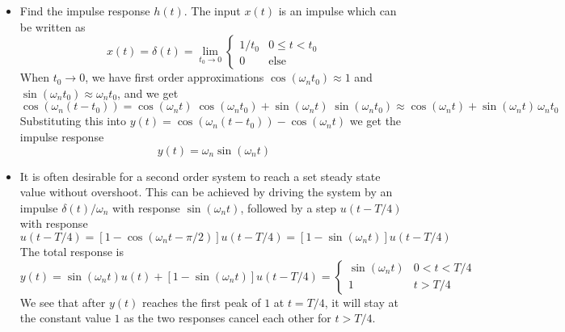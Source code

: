 \documentclass{article}
\begin{document}
\begin{itemize}
\item Find the impulse response $h(t)$. The input $x(t)$ is an impulse which
  can be written as
  \begin{equation}
    x(t)=\delta(t)=\lim_{t_0\rightarrow 0}\left\{ \begin{array}{cl}
      1/t_0 & 0\le t< t_0 \\0 & \mbox{else} \end{array}\right. 
  \end{equation}
  When $t_0\rightarrow 0$, we have first order approximations 
  $\cos(\omega_nt_0)\approx 1$ and $\sin(\omega_nt_0)\approx \omega_nt_0$, 
  and we get
  \begin{equation} 
    \cos(\omega_n(t-t_0))=\cos(\omega_nt)\;\cos(\omega_nt_0)+\sin(\omega_nt)\;
    \sin(\omega_nt_0)  \approx\cos(\omega_nt)+\sin(\omega_nt)\,\omega_nt_0
  \end{equation}
  Substituting this into $y(t)=\cos(\omega_n(t-t_0))-\cos(\omega_nt)$
  we get the impulse response 
  \begin{equation}
    y(t)=\omega_n\sin(\omega_nt) 
  \end{equation}
  
\item It is often desirable for a second order system to reach a set steady 
  state value without overshoot. This can be achieved by driving the system 
  by an impulse $\delta(t)/\omega_n$ with response $\sin(\omega_nt)$, followed 
  by a step $u(t-T/4)$ with response 
  \begin{equation}
    [1-\cos(\omega_n(t-T/4))]u(t-T/4)=[1-\cos(\omega_nt-\pi/2)]u(t-T/4)
    =[1-\sin(\omega_nt)]u(t-T/4) 
  \end{equation}
  The total response is
  \begin{equation}
    y(t)=\sin(\omega_nt)u(t)+[1-\sin(\omega_nt)]u(t-T/4)
    =\left\{\begin{array}{cl} \sin(\omega_nt) & 0<t<T/4 \\
    1 & t>T/4\end{array} \right. 
  \end{equation}
  We see that after $y(t)$ reaches the first peak of $1$ at $t=T/4$, it will
  stay at the constant value $1$ as the two responses cancel each other for
  $t>T/4$.


\end{itemize}
\end{document}
